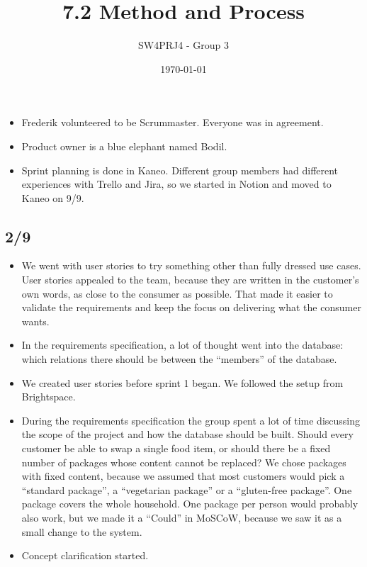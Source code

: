 \documentclass[a4paper,11pt]{article}
\title{7.2 Method and Process}
\author{SW4PRJ4 - Group 3}
\date{\today}
\begin{document}
\maketitle

\begin{itemize}
    \item Frederik volunteered to be Scrummaster. Everyone was in agreement.
    \item Product owner is a blue elephant named Bodil.
    \item Sprint planning is done in Kaneo. Different group members had different experiences with Trello and Jira, so we started in Notion and moved to Kaneo on 9/9.
\end{itemize}

\subsection*{2/9}
\begin{itemize}
    \item We went with user stories to try something other than fully dressed use cases. User stories appealed to the team, because they are written in the customer's own words, as close to the consumer as possible. That made it easier to validate the requirements and keep the focus on delivering what the consumer wants.
    \item In the requirements specification, a lot of thought went into the database: which relations there should be between the ``members'' of the database.
    \item We created user stories before sprint 1 began. We followed the setup from Brightspace.
    \item During the requirements specification the group spent a lot of time discussing the scope of the project and how the database should be built. Should every customer be able to swap a single food item, or should there be a fixed number of packages whose content cannot be replaced? We chose packages with fixed content, because we assumed that most customers would pick a ``standard package'', a ``vegetarian package'' or a ``gluten-free package''. One package covers the whole household. One package per person would probably also work, but we made it a ``Could'' in MoSCoW, because we saw it as a small change to the system.
    \item Concept clarification started.
\end{itemize}
\end{document}

